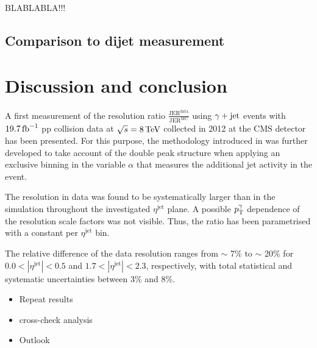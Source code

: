 BLABLABLA!!!

\section{Comparison to dijet measurement}
\label{res:sec:comparison_2012}


\FloatBarrier
\chapter{Discussion and conclusion}
A first measurement of the resolution ratio $\frac{\text{JER}^{\text{data}}}{\text{JER}^{\text{MC}}}$ 
using $\gamma + \text{jet}$ events with $19.7\,\text{fb}^{-1}$ pp collision data at $\sqrt{s}=8 \,\text{Te}\kern-0.06667em\text{V}$ collected in 2012 at the CMS detector has been presented. 
For this purpose, the methodology introduced in \cite{CMS-AN-2010-076}
was further developed to take account of the double peak structure when applying an exclusive binning in the variable $\alpha$ 
that measures the additional jet activity in the event.

The resolution in data was found to be systematically larger than in the simulation throughout the investigated $\eta^{\text{jet}}$ plane. 
A possible $p_{\text{T}}^{\gamma}$ dependence of the resolution scale factors was not visible. 
Thus, the ratio has been parametrised with a constant per $\eta^{\text{jet}}$ bin.

The relative difference of the data resolution ranges from $\sim$ 7\% to $\sim$ 20\% for  $0.0<|\eta^{\text{jet}}|<0.5$ and  $1.7<|\eta^{\text{jet}}|<2.3$, respectively, 
with total statistical and systematic uncertainties between 3\% and 8\%.



\begin{itemize}
\item Repeat results
\item cross-check analysis
\item Outlook
\end{itemize}


